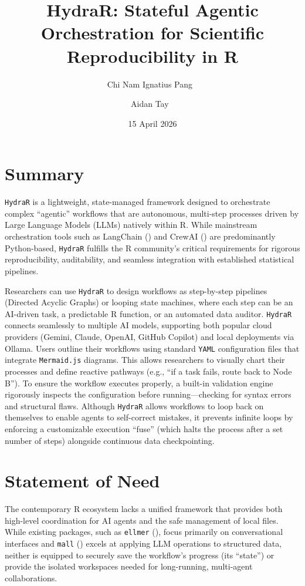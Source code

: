 \documentclass[
]{article}
\title{HydraR: Stateful Agentic Orchestration for Scientific
Reproducibility in R}
\author[1%
  ]{Chi Nam Ignatius Pang%
    \,\orcidlink{0000-0001-9703-5741}\,%
    }
\author[1%
  ]{Aidan Tay%
    \,\orcidlink{0000-0003-1315-4896}\,%
    }
\affil[1]{Australian Proteome Analysis Facility (APAF), Macquarie
University, Sydney, Australia%
  }
\date{15 April 2026}
\begin{document}
\maketitle

\section{Summary}\label{summary}

\texttt{HydraR} is a lightweight, state-managed framework designed to
orchestrate complex ``agentic'' workflows that are autonomous, multi-step
processes driven by Large Language Models (LLMs) natively within R.
While mainstream orchestration tools such as LangChain
() and CrewAI
() are predominantly Python-based,
\texttt{HydraR} fulfills the R community's critical requirements for
rigorous reproducibility, auditability, and seamless integration with
established statistical pipelines.

Researchers can use \texttt{HydraR} to design workflows as step-by-step pipelines (Directed Acyclic Graphs) or looping state machines, where each step can be an AI-driven task, a predictable R function, or an automated data auditor. \texttt{HydraR} connects seamlessly to multiple AI models, supporting both popular cloud providers (Gemini, Claude, OpenAI, GitHub Copilot) and local deployments via Ollama. Users outline their workflows using standard \texttt{YAML} configuration files that integrate \texttt{Mermaid.js} diagrams. This allows researchers to visually chart their processes and define reactive pathways (e.g., ``if a task fails, route back to Node B''). To ensure the workflow executes properly, a built-in validation engine rigorously inspects the configuration before running---checking for syntax errors and structural flaws. Although \texttt{HydraR} allows workflows to loop back on themselves to enable agents to self-correct mistakes, it prevents infinite loops by enforcing a customizable execution ``fuse'' (which halts the process after a set number of steps) alongside continuous data checkpointing.

\section{Statement of Need}\label{statement-of-need}

The contemporary R ecosystem lacks a unified framework that provides both high-level coordination for AI agents and the safe management of local files. While existing packages, such as \texttt{ellmer} (), focus primarily on conversational interfaces and \texttt{mall} () excels at applying LLM operations to structured data, neither is equipped to securely save the workflow's progress (its ``state'') or provide the isolated workspaces needed for long-running, multi-agent collaborations.
\end{document}
